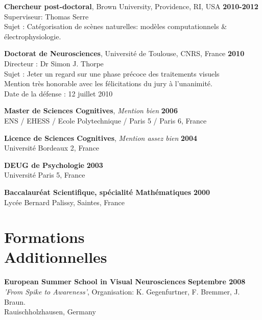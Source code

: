 \documentclass[margin,line]{resume}
\begin{document}
\begin{resume}
	\textbf{Chercheur post-doctoral}, Brown University, Providence, RI, USA \hfill \textbf{2010-2012}\\
	Superviseur: Thomas Serre\\
	Sujet : Catégorisation de scènes naturelles: modèles computationnels \& électrophysiologie.
	\vspace{-1.5mm}
	
  \textbf{Doctorat de Neurosciences}, Université de Toulouse, CNRS, France \hfill \textbf{2010}\\
	Directeur :  Dr Simon J. Thorpe\\
	Sujet : Jeter un regard sur une phase précoce des traitements visuels\\
	Mention très honorable avec les félicitations du jury à l'unanimité.\\
	Date de la défense : 12 juillet 2010
	\vspace{-1.5mm}
	
	\textbf{Master de Sciences Cognitives}, \textsl{Mention bien} \hfill \textbf{2006}\\
	ENS / EHESS / Ecole Polytechnique / Paris 5 / Paris 6, France
	\vspace{-1.5mm}
	
	\textbf{Licence de Sciences Cognitives}, \textsl{Mention assez bien} \hfill \textbf{2004}\\
	Université Bordeaux 2, France
	 
	\textbf{DEUG de Psychologie} \hfill \textbf{2003}\\
	Université Paris 5, France
	\vspace{-1.5mm}
	 
	\textbf{Baccalauréat Scientifique, spécialité Mathématiques} \hfill \textbf{2000}\\
	Lycée Bernard Palissy, Saintes, France


\vspace{3mm}
\section{\mysidestyle Formations \\ Additionnelles}

	\textbf{European Summer School in Visual Neurosciences} \hfill \textbf{Septembre 2008}\\
	\textsl{'From Spike to Awareness'}, Organisation: K. Gegenfurtner, F. Bremmer, J. Braun.\\
	Rauischholzhausen, Germany
	\vspace{-1.5mm}
	

\end{resume}
\end{document}

